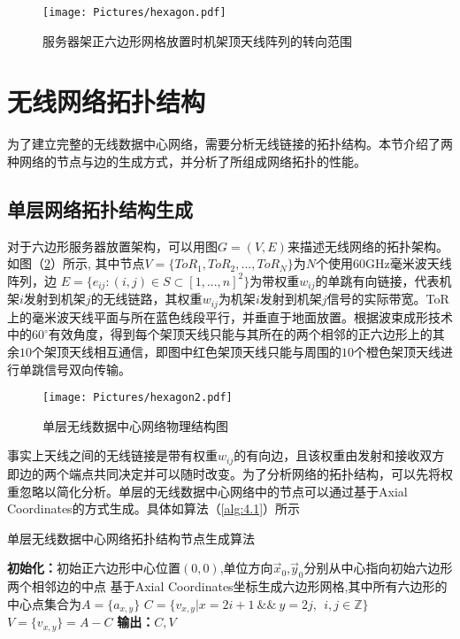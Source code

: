 \begin{figure}[htbp]
	\centering
	\texttt{[image: Pictures/hexagon.pdf]}
	\caption{服务器架正六边形网格放置时机架顶天线阵列的转向范围}
	\label{fig:hexagon}
\end{figure}

\section{无线网络拓扑结构}

为了建立完整的无线数据中心网络，需要分析无线链接的拓扑结构。本节介绍了两种网络的节点与边的生成方式，并分析了所组成网络拓扑的性能。

\subsection{单层网络拓扑结构生成}

对于六边形服务器放置架构，可以用图$G = (V,E)$来描述无线网络的拓扑架构。如图（\ref{fig:hexagon2}）所示, 其中节点$V = \{ToR_1,ToR_2,...,ToR_N\}$为$N$个使用60GHz毫米波天线阵列，边
$E =\{e_{ij}:(i,j)\in S\subset[1,...,n]^2\}$为带权重$w_{ij}$的单跳有向链接，代表机架$i$发射到机架$j$的无线链路，其权重$w_{ij}$为机架$i$发射到机架$j$信号的实际带宽。ToR上的毫米波天线平面与所在蓝色线段平行，并垂直于地面放置。根据波束成形技术中的$60^{\circ}$有效角度，得到每个架顶天线只能与其所在的两个相邻的正六边形上的其余$10$个架顶天线相互通信，即图中红色架顶天线只能与周围的$10$个橙色架顶天线进行单跳信号双向传输。

\begin{figure}[htbp]
	\centering
	\texttt{[image: Pictures/hexagon2.pdf]}
	\caption{单层无线数据中心网络物理结构图}
	\label{fig:hexagon2}
\end{figure}

事实上天线之间的无线链接是带有权重$w_{ij}$的有向边，且该权重由发射和接收双方即边的两个端点共同决定并可以随时改变。为了分析网络的拓扑结构，可以先将权重忽略以简化分析。单层的无线数据中心网络中的节点可以通过基于Axial Coordinates的方式生成。具体如算法（\ref{alg:4.1}）所示

\begin{algorithm}
	\SetAlgoLined
	\caption{单层无线数据中心网络拓扑结构节点生成算法} \label{alg:4.1}
	\textbf{初始化：}初始正六边形中心位置$(0,0)$,单位方向$\vec x_0$,$\vec y_0$分别从中心指向初始六边形两个相邻边的中点\;
	基于Axial Coordinates坐标生成六边形网格,其中所有六边形的中心点集合为$A = \{a_{x,y}\}$\;
	{
		$C = \{ v_{x,y}|x = 2i+1 ~\&\&~ y = 2j, ~~ i,j \in \mathbb{Z} \}$\;
		$V = \{v_{x,y}\} = A-C$\;
	}
	\textbf{输出：}$C,V$
\end{algorithm}

